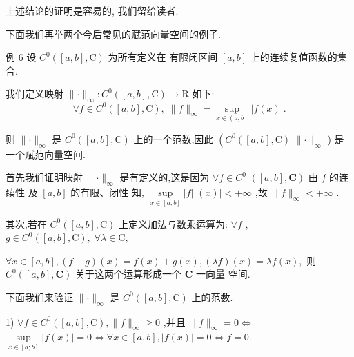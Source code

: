 上述结论的证明是容易的, 我们留给读者.

下面我们再举两个今后常见的赋范向量空间的例子.

例 6 设 ${C}^{0}\left( {\left\lbrack  {a,b}\right\rbrack  ,\mathrm{C}}\right)$ 为所有定义在 有限闭区间 $\left\lbrack  {a,b}\right\rbrack$ 上的连续复值函数的集合.

我们定义映射 $\parallel  \cdot  {\parallel }_{\infty } : {C}^{0}\left( {\left\lbrack  {a,b}\right\rbrack  ,\mathrm{C}}\right)  \rightarrow  \mathrm{R}$ 如下:
$$\forall f \in  {C}^{0}\left( {\left\lbrack  {a,b}\right\rbrack  ,\mathrm{C}}\right) ,\;\parallel f{\parallel }_{\infty } = \mathop{\sup }\limits_{{x \in  \left( {a,b}\right\rbrack  }}\left| {f\left( x\right) }\right| .$$

则 $\parallel  \cdot  {\parallel }_{\infty }$ 是 ${C}^{0}\left( {\left\lbrack  {a,b}\right\rbrack  ,\mathrm{C}}\right)$ 上的一个范数,因此 $\left( {{C}^{0}\left( {\left\lbrack  {a,b}\right\rbrack  ,\mathrm{C}}\right) }\right.$  $\parallel  \cdot  {\parallel }_{\infty }$ ) 是一个赋范向量空间.

首先我们证明映射 $\parallel  \cdot  {\parallel }_{\infty }$ 是有定义的,这是因为 $\forall f \in  {C}^{0}$  $\left( {\left\lbrack  {a,b}\right\rbrack  ,\mathbf{C}}\right)$ 由 $f$ 的连续性 及 $\left\lbrack  {a,b}\right\rbrack$ 的有限、闭性 知, $\mathop{\sup }\limits_{{x \in  \left\lbrack  {a,b}\right\rbrack  }}\left| f\right|$  $\left( x\right)  \mid   <  + \infty$ ,故 $\parallel f{\parallel }_{\infty } <  + \infty$ .

其次,若在 ${C}^{0}\left( {\left\lbrack  {a,b}\right\rbrack  ,\mathrm{C}}\right)$ 上定义加法与数乘运算为: $\forall f$ , $g \in  {C}^{0}\left( {\left\lbrack  {a,b}\right\rbrack  ,\mathrm{C}}\right) ,\;\forall \lambda  \in  \mathrm{C},$

$\forall x \in  \left\lbrack  {a,b}\right\rbrack  ,\left( {f + g}\right) \left( x\right)  = f\left( x\right)  + g\left( x\right) ,\left( {\lambda f}\right) \left( x\right)  = {\lambda f}\left( x\right) ,$ 则 ${C}^{0}\left( {\left\lbrack  {a,b}\right\rbrack  ,\mathbf{C}}\right)$ 关于这两个运算形成一个 $\mathbf{C}$ 一向量 空间.

下面我们来验证 $\parallel  \cdot  {\parallel }_{\infty }$ 是 ${C}^{0}\left( {\left\lbrack  {a,b}\right\rbrack  ,\mathrm{C}}\right)$ 上的范数.

1) $\forall f \in  {C}^{0}\left( {\left\lbrack  {a,b}\right\rbrack  ,\mathrm{C}}\right) ,\parallel f{\parallel }_{\infty } \geq  0$ ,并且 $\parallel f{\parallel }_{\infty } = 0 \Leftrightarrow$  $\mathop{\sup }\limits_{{x \in  \left\lbrack  {a;b}\right\rbrack  }}\left| {f\left( x\right) }\right|  = 0 \Leftrightarrow  \forall x \in  \left\lbrack  {a,b}\right\rbrack  ,\left| {f\left( x\right) }\right|  = 0 \Leftrightarrow  f = 0.$

